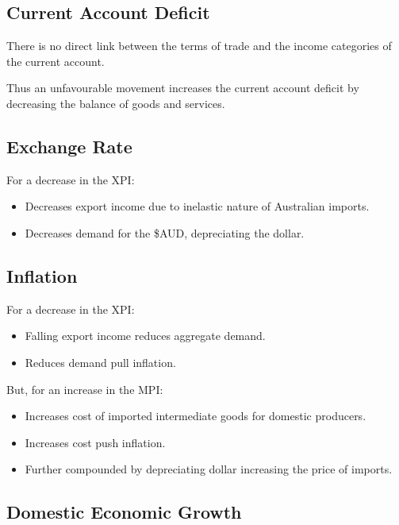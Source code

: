 \documentclass[a4paper,11pt]{article}
\begin{document}
\subsection{Current Account Deficit}

There is no direct link between the terms of trade and the income categories
of the current account.

Thus an unfavourable movement increases the current account deficit by
decreasing the balance of goods and services.


\subsection{Exchange Rate}

For a decrease in the XPI:

\begin{itemize}
\item Decreases export income due to inelastic nature of Australian imports.
\item Decreases demand for the \$AUD, depreciating the dollar.
\end{itemize}


\subsection{Inflation}

For a decrease in the XPI:

\begin{itemize}
\item Falling export income reduces aggregate demand.
\item Reduces demand pull inflation.
\end{itemize}

But, for an increase in the MPI:

\begin{itemize}
\item Increases cost of imported intermediate goods for domestic producers.
\item Increases cost push inflation.
\item Further compounded by depreciating dollar increasing the price of
	imports.
\end{itemize}


\subsection{Domestic Economic Growth}
\end{document}
